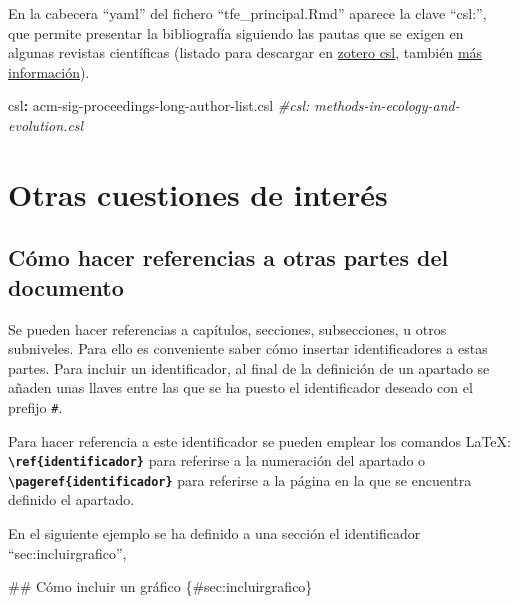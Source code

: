 \documentclass[12pt,a4paper,oneside,]{book}
\newenvironment{Shaded}{\begin{snugshade}}{\end{snugshade}}
\newcommand{\AttributeTok}[1]{\textcolor[rgb]{0.77,0.63,0.00}{#1}}
\newcommand{\CommentTok}[1]{\textcolor[rgb]{0.56,0.35,0.01}{\textit{#1}}}
\newcommand{\FunctionTok}[1]{\textcolor[rgb]{0.00,0.00,0.00}{#1}}
\newcommand{\KeywordTok}[1]{\textcolor[rgb]{0.13,0.29,0.53}{\textbf{#1}}}
\numberwithin{dummy}{section}
\theoremstyle{ocrenumbox}
\theoremstyle{blacknumex}
\theoremstyle{blacknumbox}
\theoremstyle{ocrenum}
\theoremstyle{ocrenum}
\begin{document}
En la cabecera ``yaml'' del fichero ``tfe\_principal.Rmd'' aparece la
clave ``csl:'', que permite presentar la bibliografía siguiendo las
pautas que se exigen en algunas revistas científicas (listado para
descargar en \href{https://www.zotero.org/styles/}{zotero csl}, también
\href{https://citationstyles.org/publishers/}{más información}).

\begin{Shaded}
\begin{Highlighting}[]
\FunctionTok{csl}\KeywordTok{:}\AttributeTok{ acm{-}sig{-}proceedings{-}long{-}author{-}list.csl}
\CommentTok{\#csl: methods{-}in{-}ecology{-}and{-}evolution.csl}
\end{Highlighting}
\end{Shaded}

\hypertarget{otras-cuestiones-de-interuxe9s}{%
\section{Otras cuestiones de
interés}\label{otras-cuestiones-de-interuxe9s}}

\hypertarget{cuxf3mo-hacer-referencias-a-otras-partes-del-documento}{%
\subsection{Cómo hacer referencias a otras partes del
documento}\label{cuxf3mo-hacer-referencias-a-otras-partes-del-documento}}

Se pueden hacer referencias a capítulos, secciones, subsecciones, u
otros subniveles. Para ello es conveniente saber cómo insertar
identificadores a estas partes. Para incluir un identificador, al final
de la definición de un apartado se añaden unas llaves entre las que se
ha puesto el identificador deseado con el prefijo \texttt{\#}.

Para hacer referencia a este identificador se pueden emplear los
comandos LaTeX: \textbf{\texttt{\textbackslash{}ref\{identificador\}}}
para referirse a la numeración del apartado o
\textbf{\texttt{\textbackslash{}pageref\{identificador\}}} para
referirse a la página en la que se encuentra definido el apartado.

En el siguiente ejemplo se ha definido a una sección el identificador
``sec:incluirgrafico'',

\begin{Shaded}
\begin{Highlighting}[]
\FunctionTok{\#\# Cómo incluir un gráfico \{\#sec:incluirgrafico\}}
\end{Highlighting}
\end{Shaded}
\end{document}
